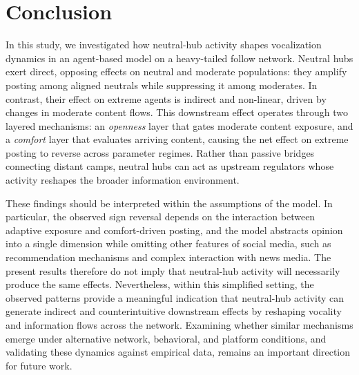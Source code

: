 \documentclass{svproc}
\def\Black{\color[rgb]{0,0,0}}
\begin{document}
\section{Conclusion}\label{sec:conclusion}
In this study, we investigated how neutral-hub activity shapes
vocalization dynamics in an agent-based model on a heavy-tailed follow
network. Neutral hubs exert direct, opposing effects on neutral and
moderate populations: they amplify posting among aligned neutrals
while suppressing it among moderates. In contrast, their effect
on extreme agents is indirect and non-linear, driven by changes in
moderate content flows. This downstream effect operates through
two layered mechanisms: an \emph{openness} layer that gates
moderate content exposure, and a \emph{comfort} layer that
evaluates arriving content, causing the net effect on extreme posting
to reverse across parameter regimes. 
Rather than passive bridges
connecting distant camps, neutral hubs can act as upstream regulators
whose activity reshapes the broader information environment.

These findings should be interpreted within the assumptions of the
model. In particular, the observed sign reversal depends on the
interaction between adaptive exposure and 
comfort-driven posting, and
the model abstracts opinion into a single dimension while omitting
other features of social media, such as recommendation mechanisms 
and complex interaction with news media. 
The present results therefore do not imply
that neutral-hub activity will necessarily produce the same effects. 
Nevertheless, within this simplified setting, the observed 
patterns provide a meaningful indication that neutral-hub 
activity can generate indirect and counterintuitive 
downstream effects by reshaping vocality and 
information flows across the network.
Examining
whether similar mechanisms emerge under alternative network,
behavioral, and platform conditions, and validating these dynamics
against empirical data, remains an important direction for future
work.

%
\Black%
%



\end{document}
